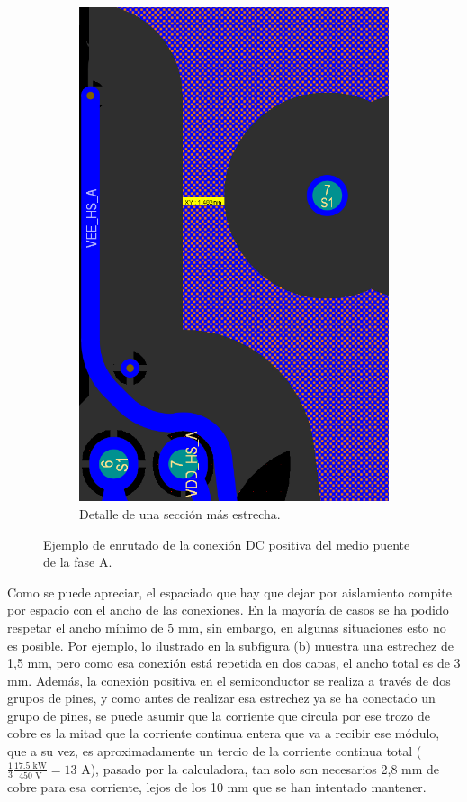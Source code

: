 \begin{figure}[H]
\begin{subfigure}{0.4\linewidth}
		\includegraphics[width=\linewidth]{fig/layout2}
		\caption{Detalle de una sección más estrecha.}
	\end{subfigure}
	\caption{Ejemplo de enrutado de la conexión DC positiva del medio puente de la fase A.}
\end{figure}

Como se puede apreciar, el espaciado que hay que dejar por aislamiento compite por espacio con el ancho de las conexiones. En la mayoría de casos se ha podido respetar el ancho mínimo de 5 mm, sin embargo, en algunas situaciones esto no es posible. Por ejemplo, lo ilustrado en la subfigura (b) muestra una estrechez de 1,5 mm, pero como esa conexión está repetida en dos capas, el ancho total es de 3 mm. Además, la conexión positiva en el semiconductor se realiza a través de dos grupos de pines, y como antes de realizar esa estrechez ya se ha conectado un grupo de pines, se puede asumir que la corriente que circula por ese trozo de cobre es la mitad que la corriente continua entera que va a recibir ese módulo, que a su vez, es aproximadamente un tercio de la corriente continua total ($\frac{1}{3}\frac{17.5 \text{ kW}}{450 \text{ V}} = 13 \text{ A}$), pasado por la calculadora, tan solo son necesarios 2,8 mm de cobre para esa corriente, lejos de los 10 mm que se han intentado mantener.

